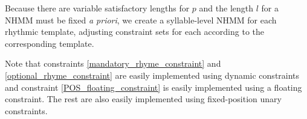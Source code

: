 \documentclass[phd,electronic,oneside,twosidetoc,letterpaper,chaptercenter,parttop,lof,lot]{byumsphd}
\begin{document}
Because there are variable satisfactory lengths for $p$ and the length $l$ for a NHMM must be fixed \textit{a priori}, we create a syllable-level NHMM for each rhythmic template, adjusting constraint sets for each according to the corresponding template. %

Note that constraints \ref{mandatory_rhyme_constraint} and \ref{optional_rhyme_constraint} are easily implemented using dynamic constraints and constraint \ref{POS_floating_constraint} is easily implemented using a floating constraint. The rest are also easily implemented using fixed-position unary constraints.
\end{document}
